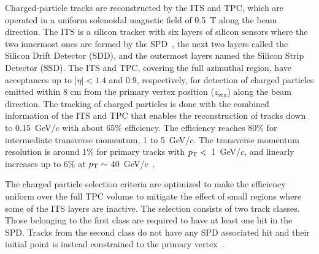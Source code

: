 Charged-particle tracks are reconstructed by the ITS and TPC, which are operated in a uniform solenoidal magnetic field of 0.5~T along the beam direction. The ITS is a silicon tracker with six layers of silicon sensors where the two innermost ones are formed by the SPD~\cite{Santoro2009:ALICESPD}, the next two layers called the Silicon Drift Detector (SDD), and the outermost layers named the Silicon Strip Detector (SSD). The ITS and TPC, covering the full azimuthal region, have acceptances up to $|\eta| < 1.4$ and 0.9, respectively, for detection of charged particles emitted within 8 cm from the primary vertex position ($z_\mathrm{vtx}$) along the beam direction. The tracking of charged particles is done with the combined information of the ITS and TPC that enables the reconstruction of tracks down to 0.15~GeV/$c$ with about 65\% efficiency. The efficiency reaches 80\% for intermediate transverse momentum, 1 to 5~GeV/$c$. The transverse momentum resolution is around 1\% for primary tracks with $p_\mathrm{T}<$~1~GeV/$c$, and linearly increases up to 6\% at $p_\mathrm{T} \sim$ 40~GeV/$c$~\cite{Contin_2012:ITSPTRES}.

The charged particle selection criteria are optimized to make the efficiency uniform over the full TPC volume to mitigate the effect of small regions where some of the ITS layers are inactive. The selection consists of two track classes. Those belonging to the first class are required to have at least one hit in the SPD. Tracks from the second class do not have any SPD associated hit and their initial point is instead constrained to the primary vertex~\cite{Adam:2015ewa}.


